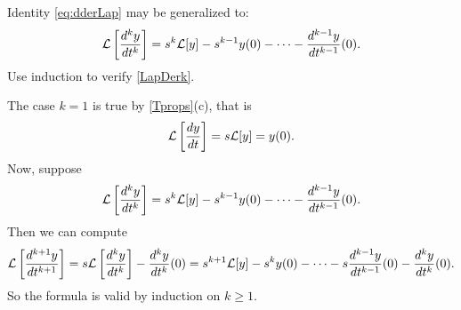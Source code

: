 \documentclass{ximera}
\begin{document}
\begin{exercise}   \label{exer:kderLap}
Identity \eqref{eq:dderLap} may be 
generalized to: 
\begin{equation}  \label{LapDerk}
{\cal L}\left[\frac{d^k y}{dt^k}\right] =
s^k{\cal L}[y] - s^{k-1} y(0) - \cdots - \frac{d^{k-1} y}{dt^{k-1}}(0).
\end{equation}
Use induction to verify \eqref{LapDerk}. 

\begin{solution}
The case $k = 1$ is true by \eqref{Tprops}(c), that is
\[
{\cal L}\left[\frac{dy}{dt}\right] = s{\cal L}[y] = y(0).
\]
Now, suppose
\[
{\cal L}\left[\frac{d^ky}{dt^k}\right] = s^k{\cal L}[y] - s^{k - 1}y(0)
- \cdots - \frac{d^{k - 1}y}{dt^{k - 1}}(0).
\]
Then we can compute
\[
{\cal L}\left[\frac{d^{k + 1}y}{dt^{k + 1}}\right] =
s{\cal L}\left[\frac{d^ky}{dt^k}\right] - \frac{d^ky}{dt^k}(0)
= s^{k + 1}{\cal L}[y] - s^{k}y(0)
- \cdots - s\frac{d^{k - 1}y}{dt^{k - 1}}(0) - \frac{d^ky}{dt^k}(0).
\]
So the formula is valid by induction on $k \geq 1$.





\end{solution}
\end{exercise}
\end{document}
